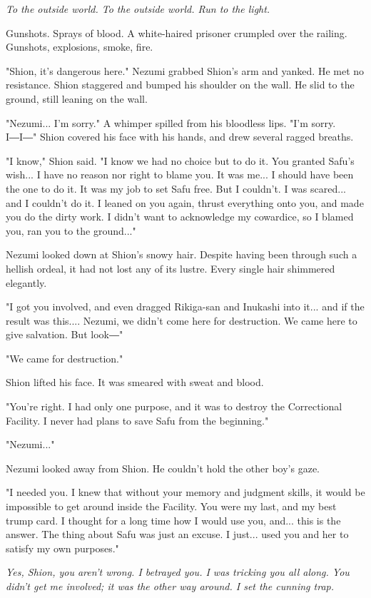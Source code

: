 \emph{To the outside world. To the outside world. Run to the light.}

Gunshots. Sprays of blood. A white-haired prisoner crumpled over the
railing. Gunshots, explosions, smoke, fire.

"Shion, it's dangerous here." Nezumi grabbed Shion's arm and yanked. He
met no resistance. Shion staggered and bumped his shoulder on the wall.
He slid to the ground, still leaning on the wall.

"Nezumi... I'm sorry." A whimper spilled from his bloodless lips. "I'm
sorry. I―I―" Shion covered his face with his hands, and drew several
ragged breaths.

"I know," Shion said. "I know we had no choice but to do it. You granted
Safu's wish... I have no reason nor right to blame you. It was me... I
should have been the one to do it. It was my job to set Safu free. But I
couldn't. I was scared... and I couldn't do it. I leaned on you again,
thrust everything onto you, and made you do the dirty work. I didn't
want to acknowledge my cowardice, so I blamed you, ran you to the
ground..."

Nezumi looked down at Shion's snowy hair. Despite having been through
such a hellish ordeal, it had not lost any of its lustre. Every single
hair shimmered elegantly.

"I got you involved, and even dragged Rikiga-san and Inukashi into it...
and if the result was this.... Nezumi, we didn't come here for
destruction. We came here to give salvation. But look―"

"We came for destruction."

Shion lifted his face. It was smeared with sweat and blood.

"You're right. I had only one purpose, and it was to destroy the
Correctional Facility. I never had plans to save Safu from the
beginning."

"Nezumi..."

Nezumi looked away from Shion. He couldn't hold the other boy's gaze.

"I needed you. I knew that without your memory and judgment skills, it
would be impossible to get around inside the Facility. You were my last,
and my best trump card. I thought for a long time how I would use you,
and... this is the answer. The thing about Safu was just an excuse. I
just... used you and her to satisfy my own purposes."

\emph{Yes, Shion, you aren't wrong. I betrayed you. I was tricking you all
	along. You didn't get me involved; it was the other way around. I set
	the cunning trap.}

